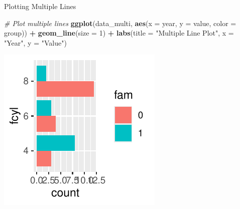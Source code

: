 \documentclass[
  ignorenonframetext,
]{beamer}
\newenvironment{Shaded}{\begin{snugshade}}{\end{snugshade}}
\newcommand{\AttributeTok}[1]{\textcolor[rgb]{0.13,0.29,0.53}{#1}}
\newcommand{\CommentTok}[1]{\textcolor[rgb]{0.56,0.35,0.01}{\textit{#1}}}
\newcommand{\DecValTok}[1]{\textcolor[rgb]{0.00,0.00,0.81}{#1}}
\newcommand{\FunctionTok}[1]{\textcolor[rgb]{0.13,0.29,0.53}{\textbf{#1}}}
\newcommand{\NormalTok}[1]{#1}
\newcommand{\SpecialCharTok}[1]{\textcolor[rgb]{0.81,0.36,0.00}{\textbf{#1}}}
\newcommand{\StringTok}[1]{\textcolor[rgb]{0.31,0.60,0.02}{#1}}
\begin{document}
\begin{frame}[fragile]{Plotting Multiple Lines}
\label{plotting-multiple-lines-1}

\begin{Shaded}
\begin{Highlighting}[]
\CommentTok{\# Plot multiple lines}
\FunctionTok{ggplot}\NormalTok{(data\_multi, }\FunctionTok{aes}\NormalTok{(}\AttributeTok{x =}\NormalTok{ year, }\AttributeTok{y =}\NormalTok{ value, }\AttributeTok{color =}\NormalTok{ group)) }\SpecialCharTok{+}
    \FunctionTok{geom\_line}\NormalTok{(}\AttributeTok{size =} \DecValTok{1}\NormalTok{) }\SpecialCharTok{+} \FunctionTok{labs}\NormalTok{(}\AttributeTok{title =} \StringTok{"Multiple Line Plot"}\NormalTok{,}
    \AttributeTok{x =} \StringTok{"Year"}\NormalTok{, }\AttributeTok{y =} \StringTok{"Value"}\NormalTok{)}
\end{Highlighting}
\end{Shaded}

\begin{center}\includegraphics[width=0.5\linewidth]{Figs/unnamed-chunk-60-1} \end{center}
\end{frame}
\end{document}
